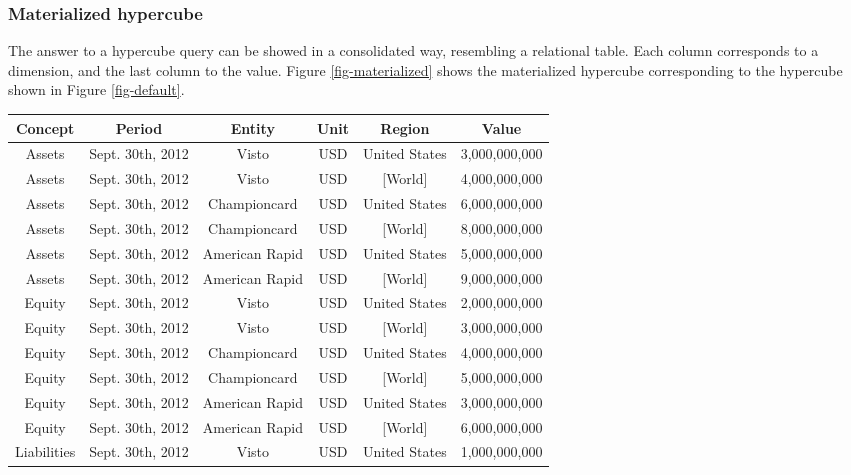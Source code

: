 \documentclass{acm_proc_article-sp}
\begin{document}
\subsubsection{Materialized hypercube}

The answer to a hypercube query can be showed in a consolidated way, resembling a relational table. Each column corresponds to a dimension, and the last column to the value. Figure \ref{fig-materialized} shows the materialized hypercube corresponding to the hypercube shown in Figure \ref{fig-default}.


\begin{figure*}
\centering
\caption{A materialized hypercube. Each row corresponds to one cell. The last column contains the value of the cell, other columns correspond to the dimensions. Default values are automatically inserted, so that this is a highly structured data cube.}
\vspace{3mm}
\label{fig-materialized}
\begin{tabular}{|c|c|c|c|c||c|}
\hline
Concept & Period & Entity & Unit & Region & Value \\
\hline
Assets & Sept. 30th, 2012 & Visto & USD & United States & 3,000,000,000 \\
Assets & Sept. 30th, 2012 & Visto & USD & [World] & 4,000,000,000 \\
Assets & Sept. 30th, 2012 & Championcard & USD & United States & 6,000,000,000 \\
Assets & Sept. 30th, 2012 & Championcard & USD & [World] & 8,000,000,000 \\
Assets & Sept. 30th, 2012 & American Rapid & USD & United States & 5,000,000,000 \\
Assets & Sept. 30th, 2012 & American Rapid & USD & [World] & 9,000,000,000 \\
Equity & Sept. 30th, 2012 & Visto & USD & United States & 2,000,000,000 \\
Equity & Sept. 30th, 2012 & Visto &USD &  [World] & 3,000,000,000 \\
Equity & Sept. 30th, 2012 & Championcard & USD & United States & 4,000,000,000 \\
Equity & Sept. 30th, 2012 & Championcard & USD & [World] & 5,000,000,000 \\
Equity & Sept. 30th, 2012 & American Rapid & USD & United States & 3,000,000,000 \\
Equity & Sept. 30th, 2012 & American Rapid & USD & [World] & 6,000,000,000 \\
Liabilities & Sept. 30th, 2012 & Visto & USD & United States & 1,000,000,000 \\

\end{tabular}
\end{figure*}
\end{document}
